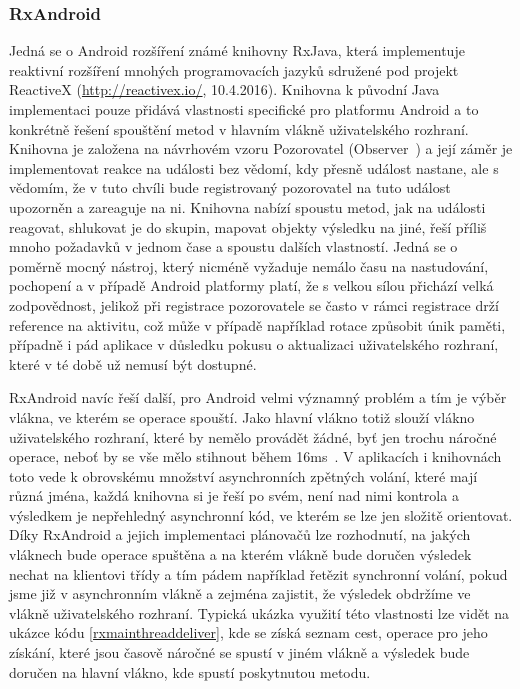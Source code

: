 \documentclass[czech,master,public,dept460,male,java,cpdeclaration]{diploma}
\begin{document}
\subsubsection{RxAndroid}\label{rxandroid}
Jedná se o Android rozšíření známé knihovny RxJava, která implementuje reaktivní rozšíření
mnohých programovacích jazyků sdružené pod projekt ReactiveX (\url{http://reactivex.io/}, 10.4.2016).
Knihovna k původní Java implementaci pouze přidává vlastnosti specifické pro platformu Android a to konkrétně
řešení spouštění metod v hlavním vlákně uživatelského rozhraní. Knihovna je založena na návrhovém
vzoru Pozorovatel (Observer~\cite{designpatterns}) a její záměr je implementovat reakce na události bez vědomí, kdy přesně
událost nastane, ale s vědomím, že v tuto chvíli bude registrovaný pozorovatel na tuto událost
upozorněn a zareaguje na ni. Knihovna nabízí spoustu metod, jak na události reagovat, shlukovat je do
skupin, mapovat objekty výsledku na jiné, řeší příliš mnoho požadavků v jednom čase a spoustu dalších vlastností.
Jedná se o poměrně mocný nástroj, který nicméně vyžaduje nemálo času na nastudování, pochopení a v případě
Android platformy platí, že s velkou sílou přichází velká zodpovědnost, jelikož při registrace pozorovatele
se často v rámci registrace drží reference na aktivitu, což může v případě například rotace způsobit únik paměti,
případně i pád aplikace v důsledku pokusu o aktualizaci uživatelského rozhraní, které v té době už nemusí být dostupné.

RxAndroid navíc řeší další, pro Android velmi významný problém a tím je výběr vlákna, ve kterém se
operace spouští. Jako hlavní vlákno totiž slouží vlákno uživatelského rozhraní, které by
nemělo provádět žádné, byť jen trochu náročné operace, neboť by se vše mělo stihnout během 16ms~\cite{perf}.
V aplikacích i knihovnách toto vede k obrovskému množství asynchronních zpětných volání, které mají různá jména,
každá knihovna si je řeší po svém, není nad nimi kontrola a výsledkem je nepřehledný asynchronní kód,
ve kterém se lze jen složitě orientovat. Díky RxAndroid a jejich implementaci plánovačů lze rozhodnutí,
na jakých vláknech bude operace spuštěna a na kterém vlákně bude doručen výsledek nechat na klientovi třídy
a tím pádem například řetězit synchronní volání, pokud jsme již v asynchronním vlákně a zejména zajistit,
že výsledek obdržíme ve vlákně uživatelského rozhraní. Typická ukázka využití této vlastnosti
lze vidět na ukázce kódu \ref{rxmainthreaddeliver}, kde se získá seznam cest, operace pro jeho získání,
které jsou časově náročné se spustí v jiném vlákně a výsledek bude doručen na hlavní vlákno,
kde spustí poskytnutou metodu.
\end{document}
